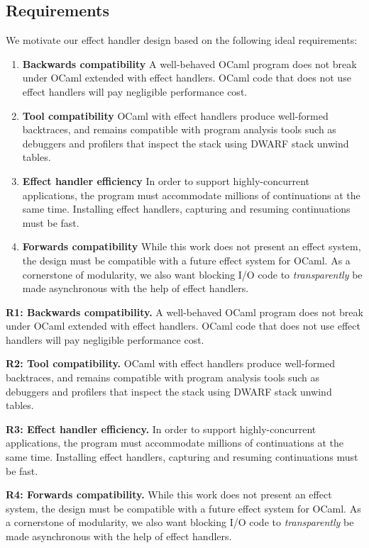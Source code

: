 \documentclass[sigplan,10pt,review,anonymous]{acmart}\settopmatter{printfolios=true,printccs=false,printacmref=false}
\begin{document}
\subsection{Requirements}
\label{sec:req}

We motivate our effect handler design based on the following ideal
requirements:

\begin{enumerate}[label=R\arabic*]
  \item \textbf{Backwards compatibility} A well-behaved OCaml program does not
    break under OCaml extended with effect handlers. OCaml code that does not
    use effect handlers will pay negligible performance cost.
  \item \textbf{Tool compatibility} OCaml with effect handlers produce
    well-formed backtraces, and remains compatible with program analysis tools
    such as debuggers and profilers that inspect the stack using DWARF stack
    unwind tables.
  \item \textbf{Effect handler efficiency} In order to support
    highly-concurrent applications, the program must accommodate millions of
    continuations at the same time. Installing effect handlers, capturing and
    resuming continuations must be fast.
  \item \textbf{Forwards compatibility} While this work does not present an
    effect system, the design must be compatible with a future effect system
    for OCaml. As a cornerstone of modularity, we also want blocking I/O code
    to \emph{transparently} be made asynchronous with the help of effect
    handlers.
\end{enumerate}
\fi

\noindent \textbf{R1: Backwards compatibility.} A well-behaved OCaml program does
not break under OCaml extended with effect handlers. OCaml code that does not
use effect handlers will pay negligible performance cost.

\noindent \textbf{R2: Tool compatibility.} OCaml with effect handlers produce
well-formed backtraces, and remains compatible with program analysis tools such
as debuggers and profilers that inspect the stack using DWARF stack unwind
tables.

\noindent \textbf{R3: Effect handler efficiency.} In order to support highly-concurrent
applications, the program must accommodate millions of continuations at the
same time. Installing effect handlers, capturing and resuming continuations
must be fast.

\noindent \textbf{R4: Forwards compatibility.} While this work does not present an
effect system, the design must be compatible with a future effect system for
OCaml. As a cornerstone of modularity, we also want blocking I/O code to
\emph{transparently} be made asynchronous with the help of effect handlers.
\end{document}
